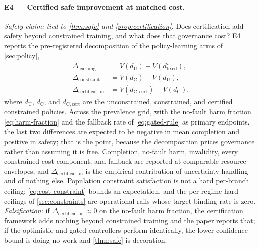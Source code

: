 \paragraph{E4 --- Certified safe improvement at matched cost.}  \emph{Safety claim; tied to
\cref{thm:safe} and \cref{prop:certification}.}  Does certification add safety
beyond constrained training, and what does that governance cost?  E4 reports
the pre-registered decomposition of the policy-learning arms of \cref{sec:policy},
\begin{equation}
 \begin{aligned}
  \Delta_{\mathrm{learning}}&=V(d_{\mathrm{U}})-V(d^\star_{\mathrm{fixed}}),\\
  \Delta_{\mathrm{constraint}}&=V(d_{\mathrm{C}})-V(d_{\mathrm{U}}),\\
  \Delta_{\mathrm{certification}}&=V(d_{\mathrm{C,cert}})-V(d_{\mathrm{C}}),
 \end{aligned}
 \label{eq:e4-decomposition}
\end{equation}
where $d_{\mathrm{U}}$, $d_{\mathrm{C}}$, and $d_{\mathrm{C,cert}}$ are the
unconstrained, constrained, and certified constrained policies.  Across the prevalence grid,
with the no-fault harm fraction \eqref{eq:harm-fraction} and the fallback rate
of \eqref{eq:gated-rule} as primary endpoints, the last two differences are
expected to be negative in mean completion and positive in safety; that is the
point, because the decomposition prices governance rather than assuming it is
free.  Completion, no-fault harm, invalidity, every constrained cost component,
and fallback are reported at comparable resource envelopes, and
$\Delta_{\mathrm{certification}}$ is the empirical contribution of uncertainty
handling and of nothing else.  Population constraint satisfaction is not a hard
per-branch ceiling: \eqref{eq:cost-constraint} bounds an expectation, and the
per-regime hard ceilings of \cref{sec:constraints} are operational rails whose
target binding rate is zero.  \emph{Falsification:} if $\Delta_{\mathrm{certification}}\approx0$ on
the no-fault harm fraction, the certification framework adds nothing beyond
constrained training and the paper reports that; if the optimistic and gated
controllers perform identically, the lower confidence bound is doing no work and
\cref{thm:safe} is decoration.

